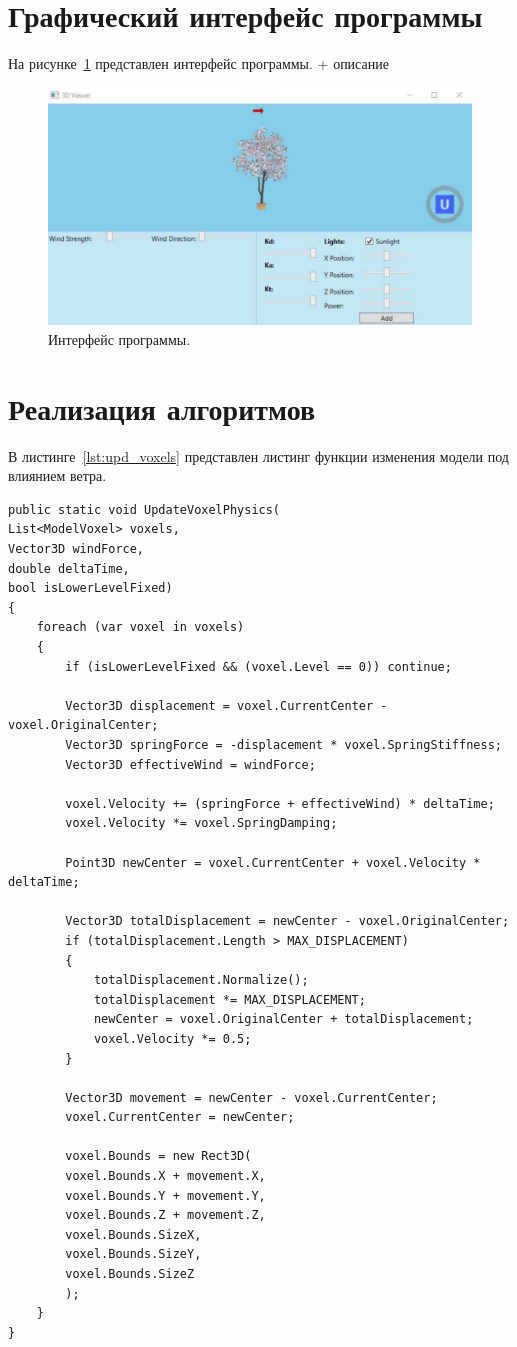 \section{Графический интерфейс программы}
На рисунке~\ref{fig:interface} представлен интерфейс программы. + описание
\begin{figure}[H]
	\centering
	\includegraphics[width=1.0\textwidth, page=1]{assets/img/interface.pdf}   
	\caption{Интерфейс программы.}
	\label{fig:interface}
\end{figure}
\section{Реализация алгоритмов}

В листинге~\ref{lst:upd_voxels} представлен листинг функции изменения модели под влиянием ветра.
\newpage
\begin{lstlisting}[style=C, caption={Фунция изменения модели под влиянием ветра},label={lst:upd_voxels}]
public static void UpdateVoxelPhysics(
List<ModelVoxel> voxels,
Vector3D windForce,
double deltaTime,
bool isLowerLevelFixed)
{
	foreach (var voxel in voxels)
	{
		if (isLowerLevelFixed && (voxel.Level == 0)) continue;
		
		Vector3D displacement = voxel.CurrentCenter - voxel.OriginalCenter;
		Vector3D springForce = -displacement * voxel.SpringStiffness;
		Vector3D effectiveWind = windForce;
		
		voxel.Velocity += (springForce + effectiveWind) * deltaTime;
		voxel.Velocity *= voxel.SpringDamping;
		
		Point3D newCenter = voxel.CurrentCenter + voxel.Velocity * deltaTime;
		
		Vector3D totalDisplacement = newCenter - voxel.OriginalCenter;
		if (totalDisplacement.Length > MAX_DISPLACEMENT)
		{
			totalDisplacement.Normalize();
			totalDisplacement *= MAX_DISPLACEMENT;
			newCenter = voxel.OriginalCenter + totalDisplacement;
			voxel.Velocity *= 0.5; 
		}
		
		Vector3D movement = newCenter - voxel.CurrentCenter;
		voxel.CurrentCenter = newCenter;
		
		voxel.Bounds = new Rect3D(
		voxel.Bounds.X + movement.X,
		voxel.Bounds.Y + movement.Y,
		voxel.Bounds.Z + movement.Z,
		voxel.Bounds.SizeX,
		voxel.Bounds.SizeY,
		voxel.Bounds.SizeZ
		);
	}
}
\end{lstlisting}

